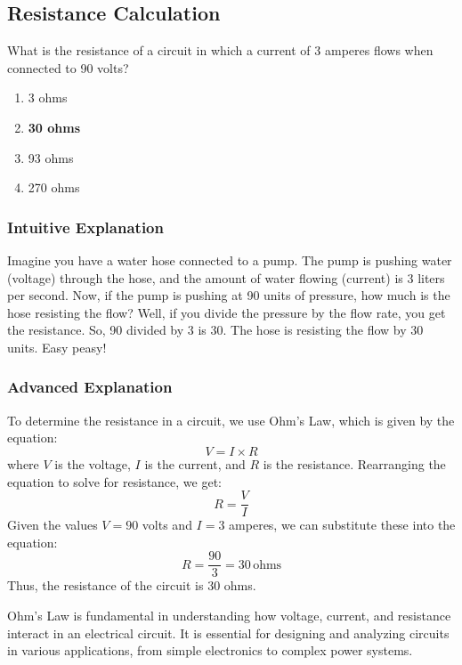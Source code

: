 \subsection{Resistance Calculation}
\label{T5D04}

\begin{tcolorbox}[colback=gray!10!white,colframe=black!75!black,title=T5D04]
What is the resistance of a circuit in which a current of 3 amperes flows when connected to 90 volts?
\begin{enumerate}[label=\Alph*)]
    \item 3 ohms
    \item \textbf{30 ohms}
    \item 93 ohms
    \item 270 ohms
\end{enumerate}
\end{tcolorbox}

\subsubsection{Intuitive Explanation}
Imagine you have a water hose connected to a pump. The pump is pushing water (voltage) through the hose, and the amount of water flowing (current) is 3 liters per second. Now, if the pump is pushing at 90 units of pressure, how much is the hose resisting the flow? Well, if you divide the pressure by the flow rate, you get the resistance. So, 90 divided by 3 is 30. The hose is resisting the flow by 30 units. Easy peasy!

\subsubsection{Advanced Explanation}
To determine the resistance in a circuit, we use Ohm's Law, which is given by the equation:
\[
V = I \times R
\]
where \( V \) is the voltage, \( I \) is the current, and \( R \) is the resistance. Rearranging the equation to solve for resistance, we get:
\[
R = \frac{V}{I}
\]
Given the values \( V = 90 \) volts and \( I = 3 \) amperes, we can substitute these into the equation:
\[
R = \frac{90}{3} = 30 \, \text{ohms}
\]
Thus, the resistance of the circuit is 30 ohms.

Ohm's Law is fundamental in understanding how voltage, current, and resistance interact in an electrical circuit. It is essential for designing and analyzing circuits in various applications, from simple electronics to complex power systems.

